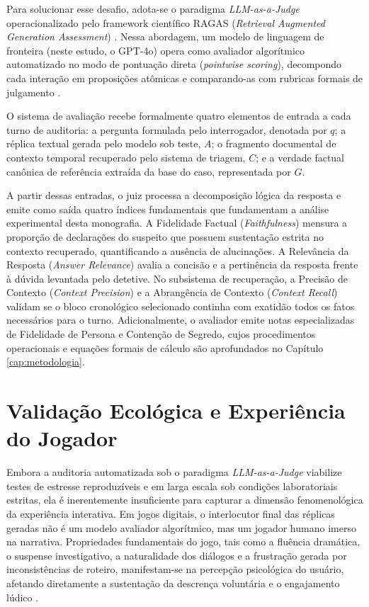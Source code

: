Para solucionar esse desafio, adota-se o paradigma \textit{LLM-as-a-Judge} operacionalizado pelo framework científico RAGAS (\textit{Retrieval Augmented Generation Assessment}) \cite{es2024ragas}. Nessa abordagem, um modelo de linguagem de fronteira (neste estudo, o GPT-4o) opera como avaliador algorítmico automatizado no modo de pontuação direta (\textit{pointwise scoring}), decompondo cada interação em proposições atômicas e comparando-as com rubricas formais de julgamento \cite{zheng2023judging,kim2024prometheus}.

O sistema de avaliação recebe formalmente quatro elementos de entrada a cada turno de auditoria: a pergunta formulada pelo interrogador, denotada por $q$; a réplica textual gerada pelo modelo sob teste, $A$; o fragmento documental de contexto temporal recuperado pelo sistema de triagem, $C$; e a verdade factual canônica de referência extraída da base do caso, representada por $G$.

A partir dessas entradas, o juiz processa a decomposição lógica da resposta e emite como saída quatro índices fundamentais que fundamentam a análise experimental desta monografia. A Fidelidade Factual (\textit{Faithfulness}) mensura a proporção de declarações do suspeito que possuem sustentação estrita no contexto recuperado, quantificando a ausência de alucinações. A Relevância da Resposta (\textit{Answer Relevance}) avalia a concisão e a pertinência da resposta frente à dúvida levantada pelo detetive. No subsistema de recuperação, a Precisão de Contexto (\textit{Context Precision}) e a Abrangência de Contexto (\textit{Context Recall}) validam se o bloco cronológico selecionado continha com exatidão todos os fatos necessários para o turno. Adicionalmente, o avaliador emite notas especializadas de Fidelidade de Persona e Contenção de Segredo, cujos procedimentos operacionais e equações formais de cálculo são aprofundados no Capítulo \ref{cap:metodologia}.

\section{Validação Ecológica e Experiência do Jogador}
\label{sec:ref_validacao_humana}

Embora a auditoria automatizada sob o paradigma \textit{LLM-as-a-Judge} viabilize testes de estresse reproduzíveis e em larga escala sob condições laboratoriais estritas, ela é inerentemente insuficiente para capturar a dimensão fenomenológica da experiência interativa. Em jogos digitais, o interlocutor final das réplicas geradas não é um modelo avaliador algorítmico, mas um jogador humano imerso na narrativa. Propriedades fundamentais do jogo, tais como a fluência dramática, o suspense investigativo, a naturalidade dos diálogos e a frustração gerada por inconsistências de roteiro, manifestam-se na percepção psicológica do usuário, afetando diretamente a sustentação da descrença voluntária e o engajamento lúdico \cite{bowman2007virtual,bates1994role}.

